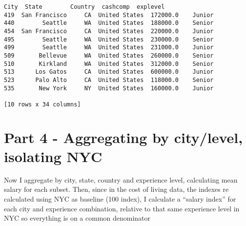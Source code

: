 \documentclass[11pt]{article}
\begin{document}
\begin{Verbatim}[commandchars=\\\{\}]
              City  State        Country  cashcomp  explevel
419  San Francisco     CA  United States  172000.0    Junior
440        Seattle     WA  United States  188000.0    Senior
454  San Francisco     CA  United States  220000.0    Junior
495        Seattle     WA  United States  230000.0    Senior
499        Seattle     WA  United States  231000.0    Junior
509       Bellevue     WA  United States  260000.0    Senior
510       Kirkland     WA  United States  312000.0    Senior
513      Los Gatos     CA  United States  600000.0    Junior
523      Palo Alto     CA  United States  118000.0    Senior
535       New York     NY  United States  160000.0    Junior

[10 rows x 34 columns]
    \end{Verbatim}

    \hypertarget{part-4---aggregating-by-citylevel-isolating-nyc}{%
\section{Part 4 - Aggregating by city/level, isolating
NYC}\label{part-4---aggregating-by-citylevel-isolating-nyc}}

    Now I aggregate by city, state, country and experience level,
calculating mean salary for each subset. Then, since in the cost of
living data, the indexes re calculated using NYC as baseline (100
index), I calculate a ``salary index'' for each city and experience
combination, relative to that same experience level in NYC so everything
is on a common denominator
\end{document}
